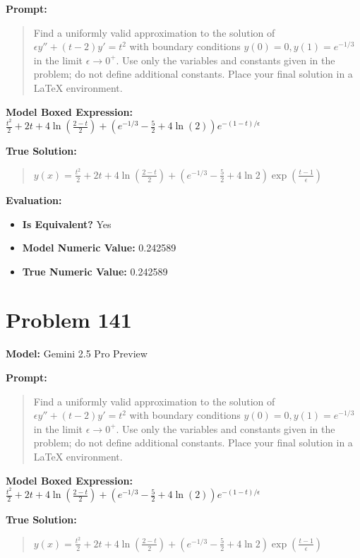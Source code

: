 \documentclass{article}
\begin{document}
{\textbf{Prompt:}
\begin{quote}
Find a uniformly valid approximation to the solution of $\epsilon y'' + (t-2) y' = t^2$ with boundary conditions $y(0) = 0, y(1) = e^{-1/3}$ in the limit $\epsilon \to 0^+$. Use only the variables and constants given in the problem; do not define additional constants. Place your final solution in a $\boxed{}$ LaTeX environment.
\end{quote}
\textbf{Model Boxed Expression:} $\frac{t^2}{2} + 2t + 4\ln\left(\frac{2-t}{2}\right) + \left(e^{-1/3} - \frac{5}{2} + 4\ln(2)\right)e^{-(1-t)/\epsilon}$

\textbf{True Solution:}
\begin{quote}
$y(x) = \frac{t^2}{2} + 2t + 4\ln \left( \frac{2-t}{2} \right) + \left( e^{-1/3} -\frac{5}{2} + 4\ln 2 \right)\exp\left( \frac{t-1}{\epsilon}\right)$
\end{quote}

\textbf{Evaluation:}
\begin{itemize}
\item \textbf{Is Equivalent?} Yes
\item \textbf{Model Numeric Value:} 0.242589
\item \textbf{True Numeric Value:} 0.242589
\end{itemize}
\vspace{1cm}
\section*{Problem 141}
\textbf{Model:} Gemini 2.5 Pro Preview

\textbf{Prompt:}
\begin{quote}
Find a uniformly valid approximation to the solution of $\epsilon y'' + (t-2) y' = t^2$ with boundary conditions $y(0) = 0, y(1) = e^{-1/3}$ in the limit $\epsilon \to 0^+$. Use only the variables and constants given in the problem; do not define additional constants. Place your final solution in a $\boxed{}$ LaTeX environment.
\end{quote}
\textbf{Model Boxed Expression:} $\frac{t^2}{2} + 2t + 4 \ln\left(\frac{2-t}{2}\right) + \left(e^{-1/3} - \frac{5}{2} + 4 \ln(2)\right)e^{-(1-t)/\epsilon}$

\textbf{True Solution:}
\begin{quote}
$y(x) = \frac{t^2}{2} + 2t + 4\ln \left( \frac{2-t}{2} \right) + \left( e^{-1/3} -\frac{5}{2} + 4\ln 2 \right)\exp\left( \frac{t-1}{\epsilon}\right)$
\end{quote}

}
\end{document}
